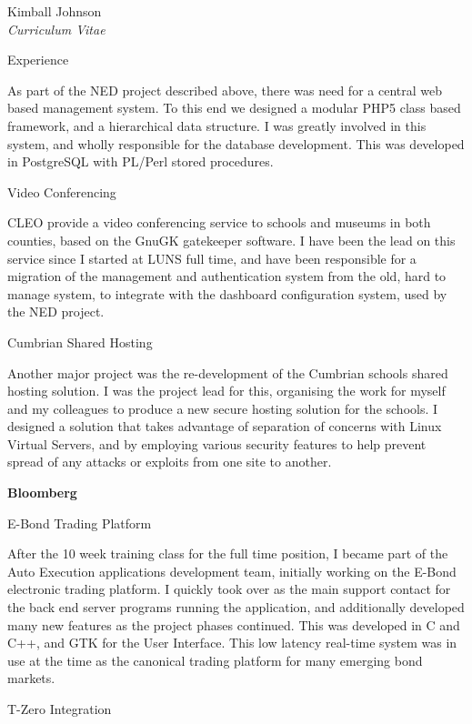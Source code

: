 \documentclass[10pt]{article}
\newenvironment{subbulletlist}{%
	\begin{list}{\labelitemii}{%
		\setlength{\topsep}{\itemsep}\setlength{\parskip}{\parsep}%
	}%
}%
{ \end{list} }
\begin{document}
\begin{cv}{Kimball Johnson\\{\large \itshape Curriculum Vitae}}
\begin{cvlist}{Experience}
\begin{subbulletlist}
		As part of the NED project described above, there was need for a central 
		web based management system.  To this end we designed a modular PHP5 class 
		based framework, and a hierarchical data structure. I was greatly involved 
		in this system, and wholly responsible for the database development. This was 
		developed in PostgreSQL with PL/Perl stored procedures.
    \item Video Conferencing 

        CLEO provide a video conferencing service to schools and museums in
        both counties, based on the GnuGK gatekeeper software.  I have
        been the lead on this service since I started at LUNS full time, and
        have been responsible for a migration of the management and
        authentication system from the old, hard to manage system, to integrate
        with the dashboard configuration system, used by the NED project.
    \item Cumbrian Shared Hosting 

        Another major project was the re-development of the Cumbrian
        schools shared hosting solution.  I was the project lead for this,
        organising the work for myself and my colleagues to produce a new 
        secure hosting solution for the schools.  I designed a 
        solution that takes advantage of separation of concerns with Linux 
        Virtual Servers, and by employing various security features to help
        prevent spread of any attacks or exploits from one site to another.
	\end{subbulletlist}
	
	\item \textbf{Bloomberg}

	\begin{subbulletlist}
    \item E-Bond Trading Platform

    After the 10 week training class for the full time position, I became part of 
    the Auto Execution applications development team, initially working on the 
    E-Bond electronic trading platform. I quickly took over as the main support 
    contact for the back end server programs running the application, and 
    additionally developed many new features as the project phases continued.
    This was developed in C and C++, and GTK for the User Interface.  This low latency 
	real-time system was in use at the time as the canonical trading platform for 
	many emerging bond markets.
    
    \item T-Zero Integration


\end{subbulletlist}
\end{cvlist}
\end{cv}
\end{document}
